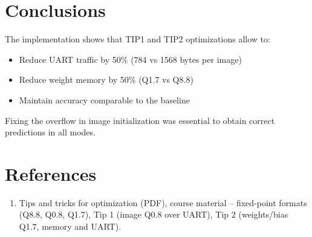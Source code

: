 \documentclass[11pt,a4paper]{article}
\begin{document}
\section{Conclusions}

The implementation shows that TIP1 and TIP2 optimizations allow to:
\begin{itemize}
    \item Reduce UART traffic by 50\% (784 vs 1568 bytes per image)
    \item Reduce weight memory by 50\% (Q1.7 vs Q8.8)
    \item Maintain accuracy comparable to the baseline
\end{itemize}

Fixing the overflow in image initialization was essential to obtain correct predictions in all modes.

\section*{References}

\begin{enumerate}
    \item \label{ref:tipstricks} Tips and tricks for optimization (PDF), course material -- fixed-point formats (Q8.8, Q0.8, Q1.7), Tip 1 (image Q0.8 over UART), Tip 2 (weights/bias Q1.7, memory and UART).
\end{enumerate}
\end{document}
